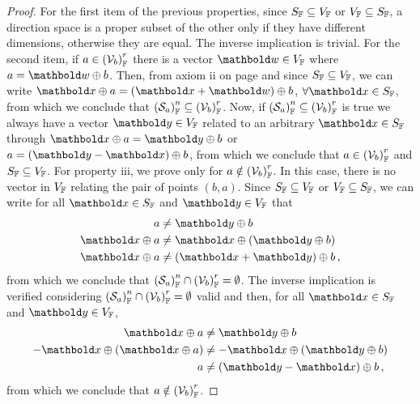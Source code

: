 {\footnotesize
\begin{proof}
For the first item of the previous properties, since $S_\cam{F}\subseteq V_\cam{F}$ or $V_\cam{F}\subseteq S_\cam{F}$, a direction space is a proper subset of the other only if they have different dimensions, otherwise they are equal. The inverse implication is trivial. For the second item, if $a\in \eamsd{V}{F}{b}{r}$ there is a vector $\vto{w}\in V_\cam{F}$ where $a=\vto{w}\oplus b$. Then, from axiom ii on page \pageref{ax:pointSpaces} and since $S_\cam{F}\subseteq V_\cam{F}$, we can write $\vto{x}\oplus a=(\vto{x}+\vto{w})\oplus b$, $\forall \vto{x}\in S_\cam{F}$, from which we conclude that $\eamsd{S}{F}{a}{n}\subseteq\eamsd{V}{F}{b}{r}$. Now, if $\eamsd{S}{F}{a}{n}\subseteq\eamsd{V}{F}{b}{r}$ is true we always have a vector $\vto{y}\in V_\cam{F}$ related to an arbitrary $\vto{x}\in S_\cam{F}$ through $\vto{x}\oplus a=\vto{y}\oplus b$ or $a=(\vto{y}-\vto{x})\oplus b$, from which we conclude that $a\in \eamsd{V}{F}{b}{r}$ and $S_\cam{F}\subseteq V_\cam{F}$. For  property iii, we prove only for $a\notin \eamsd{V}{F}{b}{r}$. In this case, there is no vector in $V_\cam{F}$ relating the pair of points $(b,a)$. Since $S_\cam{F}\subseteq V_\cam{F}$ or $V_\cam{F}\subseteq S_\cam{F}$, we can write for all $\vto{x}\in S_\cam{F}$ and $\vto{y}\in V_\cam{F}$ that
\begin{align*}
a &\neq \vto{y}\oplus b\\
\vto{x}\oplus a &\neq \vto{x}\oplus(\vto{y}\oplus b)\\
\vto{x}\oplus a &\neq (\vto{x}+\vto{y})\oplus b\,,
\end{align*}
from which we conclude that $\eamsd{S}{F}{a}{n}\cap\eamsd{V}{F}{b}{r}=\emptyset$. The inverse implication is verified considering $\eamsd{S}{F}{a}{n}\cap\eamsd{V}{F}{b}{r}=\emptyset$ valid and then, for all $\vto{x}\in S_\cam{F}$ and $\vto{y}\in V_\cam{F}$,
\begin{align*}
\vto{x}\oplus a &\neq \vto{y}\oplus b\\
-\vto{x}\oplus(\vto{x}\oplus a) &\neq -\vto{x}\oplus(\vto{y}\oplus b)\\
a &\neq (\vto{y}-\vto{x})\oplus b\,,
\end{align*}
from which we conclude that $a\notin \eamsd{V}{F}{b}{r}$.
\end{proof}}

\begin{figure}[!ht]
	\centering
	\begin{center}
		\scalebox{.72}{}
	\end{center}
	\label{fg:paralelo}
\end{figure}

